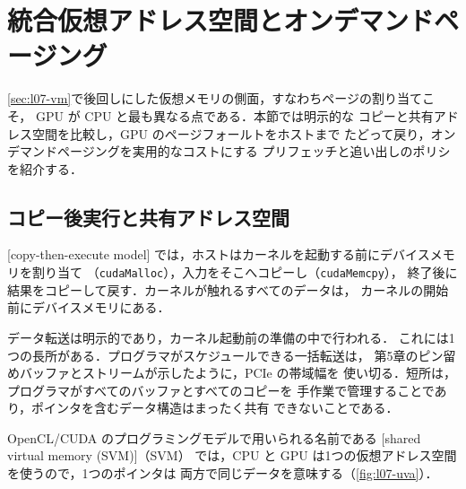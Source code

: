 \documentclass[../main.tex]{subfiles}
\begin{document}
\section{統合仮想アドレス空間とオンデマンドページング}
\label{sec:l07-uva}

\cref{sec:l07-vm}で後回しにした仮想メモリの側面，すなわちページの割り当てこそ，
GPU が CPU と最も異なる点である．本節では明示的な
コピーと共有アドレス空間を比較し，GPU のページフォールトをホストまで
たどって戻り，オンデマンドページングを実用的なコストにする
プリフェッチと追い出しのポリシを紹介する．

\subsection{コピー後実行と共有アドレス空間}

\begin{definition}[コピー後実行モデル]
  \label{def:l07-copy-then-execute}
  [copy-then-execute model]
  では，ホストはカーネルを起動する前にデバイスメモリを割り当て
  （\texttt{cudaMalloc}），入力をそこへコピーし（\texttt{cudaMemcpy}），
  終了後に結果をコピーして戻す．カーネルが触れるすべてのデータは，
  カーネルの開始前にデバイスメモリにある．
\end{definition}

データ転送は明示的であり，カーネル起動前の準備の中で行われる．
これには1つの長所がある．プログラマがスケジュールできる一括転送は，
第5章のピン留めバッファとストリームが示したように，PCIe の帯域幅を
使い切る．短所は，プログラマがすべてのバッファとすべてのコピーを
手作業で管理することであり，ポインタを含むデータ構造はまったく共有
できないことである．

%
\begin{definition}[共有仮想メモリ]
  \label{def:l07-svm}
  OpenCL/CUDA のプログラミングモデルで用いられる名前である
  [shared virtual memory (SVM)]（SVM）
  では，CPU と GPU は1つの仮想アドレス空間を使うので，1つのポインタは
  両方で同じデータを意味する（\cref{fig:l07-uva}）．
\end{definition}
\end{document}
